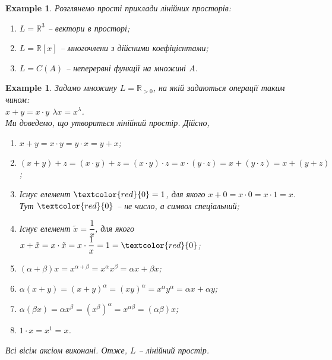 \documentclass[a4paper, 10pt]{article}
\theoremstyle{theoremdd}
\newtheorem{example}[theorem]{Example}
\newtheorem{remark}[theorem]{Remark}
\begin{document}
	\iffalse
	\begin{remark}
	Да й взагалі-то кажучи, лінійний простір можна визначити на будь-якому полі $F$. Зокрема множини $\mathbb{R}, \mathbb{C}$ самі утворюють поле, але це вже просунута штука.
	\end{remark}
	\fi
	
	\begin{example}
	Розглянемо прості приклади лінійних просторів:
	\begin{enumerate}[nosep, wide=0pt, label={\arabic*)}]
	\item $L = \mathbb{R}^3$ -- вектори в просторі;
	\item $L = \mathbb{R}[x]$ -- многочлени з дійсними коефіцієнтами;
	\item $L = C(A)$ -- неперервні функції на множині $A$.
	\end{enumerate}
	\end{example}
	
	\begin{example}
	Задамо множину $L = \mathbb{R}_{> 0}$, на якій задаються операції таким чином:\\
	$x + y = x \cdot y$ \qquad $\lambda x = x^\lambda$.\\
	Ми доведемо, що утвориться лінійний простір. Дійсно,
	\begin{enumerate}[nosep, wide=0pt, label={\arabic*)}]
	\item $x+y = x \cdot y = y \cdot x = y + x$;
	\item $(x+y) + z = (x \cdot y) + z = (x \cdot y) \cdot z = x \cdot (y \cdot z) = x + (y \cdot z) = x + (y + z)$;
	\item Існує елемент $\textcolor{red}{0} = 1$, для якого $x + 0 = x \cdot 0 = x \cdot 1 = x$. Тут $\textcolor{red}{0}$ -- не число, а символ спеціальний;
	\item Існує елемент $\tilde{x} = \dfrac{1}{x}$, для якого $x + \tilde{x} = x \cdot \tilde{x} = x \cdot \dfrac{1}{x} = 1 = \textcolor{red}{0}$;
	\item $(\alpha + \beta)x = x^{\alpha + \beta} = x^{\alpha} x^{\beta} = \alpha x + \beta x$;
	\item $\alpha (x+y) = (x+y)^\alpha = (xy)^{\alpha} = x^{\alpha} y^{\alpha} = \alpha x + \alpha y$;
	\item $\alpha (\beta x) = \alpha x^\beta = (x^\beta)^\alpha = x^{\alpha \beta} = (\alpha \beta) x$;
	\item $1 \cdot x = x^1 = x$.
	\end{enumerate}
	Всі вісім аксіом виконані. Отже, $L$ -- лінійний простір.
	\end{example}
	
\end{document}
